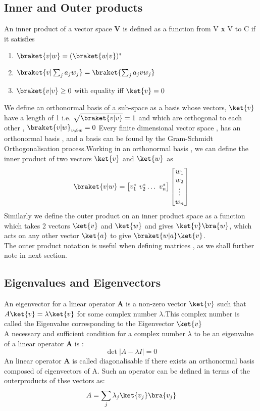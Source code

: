 \subsection{Inner and Outer products}
An inner product of a vector space \textbf{V} is defined as a function from V \textbf{x} V to C if it satisfies
\begin{enumerate}
\item $\braket{v|w} = (\braket{w|v})^*$
\item $\braket{v|\sum_j a_j w_j} = \braket{\sum_j a_j v w_j }$
\item $\braket{v|v}\geq 0$ with equality iff $\ket{v} = 0$
\end{enumerate}
We define an orthonormal basis of a sub-space as a basis whose vectors, $\ket{v}$ have a length of 1 i.e. $\sqrt{\braket{v|v}}=1$
and which are orthogonal to each other , $\braket{v|w}_{v\neq w} = 0$
Every finite dimensional vector space , has an orthonormal basis , and a basis can be found by the Gram-Schmidt Orthogonalisation process.Working in an orthonormal basis , we can define the inner product of two vectors $\ket{v}$ and $\ket{w}$ as 
$$  \braket{v|w} =  \begin{bmatrix}v_1^* ~v_2^* \hdots ~v_n^*\end{bmatrix}\begin{bmatrix} w_1 \\ w_2\\ \vdots \\w_n
\end{bmatrix} $$
Similarly we define the outer product on an inner product space as
a function which takes 2 vectors $\ket{v}$ and $\ket{w}$ and gives $ \ket{v}\bra{w}$, which acts on any other vector $\ket{a}$ to give $\braket{w|a}\ket{v}$. \\
The outer product notation is useful when defining matrices , as we shall further note in next section.

\subsection{Eigenvalues  and Eigenvectors}
An eigenvector for a linear operator \textbf{A} is a non-zero vector $\ket{v}$ such that \\$A\ket{v} = \lambda \ket{v}$ for some complex number $\lambda$.This complex number is called the Eigenvalue corresponding to the Eigenvector $\ket{v}$\\
A necessary and sufficient condition for a complex number $\lambda$ to be an eigenvalue of a linear operator \textbf{A} is :
$$ \det |A-\lambda I| = 0$$
An linear operator \textbf{A} is called diagonalisable if there exists an orthonormal basis composed of eigenvectors of A. Such an operator can be defined in terms of the outerproducts of thse vectors as:
$$ A = \sum_j \lambda_j \ket{v_j}\bra{v_j}$$